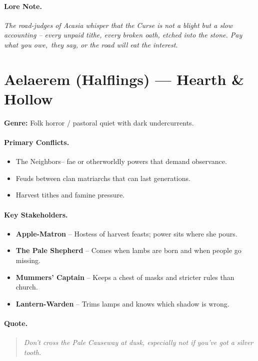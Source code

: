 \paragraph{Lore Note.}
\emph{The road-judges of Acasia whisper that the Curse is not a blight but a slow accounting -- every unpaid tithe, every broken oath, etched into the stone. \textquotedbl Pay what you owe,\textquotedbl\ they say, \textquotedbl or the road will eat the interest.\textquotedbl}

\section{Aelaerem (Halflings) --- \textquotedbl Hearth \& Hollow\textquotedbl}
\textbf{Genre:} Folk horror / pastoral quiet with dark undercurrents.

\paragraph{Primary Conflicts.}
\begin{itemize}
  \item The \textquotedbl Neighbors\textquotedbl -- fae or otherworldly powers that demand observance.
  \item Feuds between clan matriarchs that can last generations.
  \item Harvest tithes and famine pressure.
\end{itemize}

\paragraph{Key Stakeholders.}
\begin{itemize}
  \item \textbf{Apple-Matron} -- Hostess of harvest feasts; power sits where she pours.
  \item \textbf{The Pale Shepherd} -- Comes when lambs are born and when people go missing.
  \item \textbf{Mummers' Captain} -- Keeps a chest of masks and stricter rules than church.
  \item \textbf{Lantern-Warden} -- Trims lamps and knows which shadow is wrong.
\end{itemize}

\paragraph{Quote.}
\begin{quote}
\emph{\textquotedbl Don't cross the Pale Causeway at dusk, especially not if you've got a silver tooth.\textquotedbl}
\end{quote}

